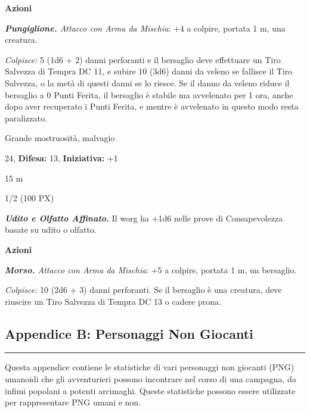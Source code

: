 \begin{multicols}{2}
{\textbf{Azioni}

\emph{\textbf{Pungiglione.} Attacco con Arma da Mischia}: +4 a colpire, portata 1 m, una creatura.

\emph{Colpisce:} 5 (1d6 + 2) danni perforanti e il bersaglio deve effettuare un Tiro Salvezza di Tempra DC 11, e subire 10 (3d6) danni da veleno se fallisce il Tiro Salvezza, o la metà di questi danni se lo riesce. Se il danno da veleno riduce il bersaglio a 0 Punti Ferita, il bersaglio è stabile ma avvelenato per 1 ora, anche dopo aver recuperato i Punti Ferita, e mentre è avvelenato in questo modo resta paralizzato.

\begin{description}[noitemsep, topsep=0pt, parsep=0pt, partopsep=0pt, leftmargin=0cm, labelwidth=2.2cm]
    \item[\textbf{Taglia/Tipo:}] Grande mostruosità, malvagio
    \item[\textbf{Caratt.:}] 
    \item[\textbf{Punti Ferita:}] 24,  \textbf{Difesa:} 13,  \textbf{Iniziativa:} +1
    \item[\textbf{Tiri Salvez.:}] 
    \item[\textbf{Movimento:}] 15 m
    \item[\textbf{Sfida:}] 1/2 (100 PX)\smallskip
\end{description}

\emph{\textbf{Udito e Olfatto Affinato.}} Il worg ha +1d6 nelle prove di Consapevolezza basate su udito o olfatto.

\textbf{Azioni}

\emph{\textbf{Morso.} Attacco con Arma da Mischia}: +5 a colpire, portata 1 m, un bersaglio.

\emph{Colpisce:} 10 (2d6 + 3) danni perforanti. Se il bersaglio è una creatura, deve riuscire un Tiro Salvezza di Tempra DC 13 o cadere prona.

\subsection{Appendice B: Personaggi Non Giocanti}\noindent\rule{\linewidth}{2pt} 

Questa appendice contiene le statistiche di vari personaggi non giocanti (PNG) umanoidi che gli avventurieri possono incontrare nel corso di una campagna, da infimi popolani a potenti arcimaghi. Queste statistiche possono essere utilizzate per rappresentare PNG umani e non.

}
\end{multicols}
